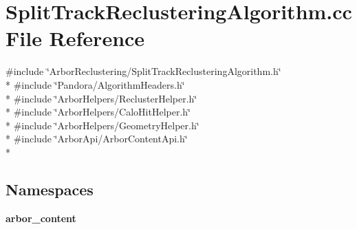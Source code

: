 \section{Split\+Track\+Reclustering\+Algorithm.\+cc File Reference}
\label{SplitTrackReclusteringAlgorithm_8cc}
{\ttfamily \#include \char`\"{}Arbor\+Reclustering/\+Split\+Track\+Reclustering\+Algorithm.\+h\char`\"{}}\\*
{\ttfamily \#include \char`\"{}Pandora/\+Algorithm\+Headers.\+h\char`\"{}}\\*
{\ttfamily \#include \char`\"{}Arbor\+Helpers/\+Recluster\+Helper.\+h\char`\"{}}\\*
{\ttfamily \#include \char`\"{}Arbor\+Helpers/\+Calo\+Hit\+Helper.\+h\char`\"{}}\\*
{\ttfamily \#include \char`\"{}Arbor\+Helpers/\+Geometry\+Helper.\+h\char`\"{}}\\*
{\ttfamily \#include \char`\"{}Arbor\+Api/\+Arbor\+Content\+Api.\+h\char`\"{}}\\*
\subsection*{Namespaces}
\begin{DoxyCompactItemize}
\item 
 {\bf arbor\+\_\+content}
\end{DoxyCompactItemize}
